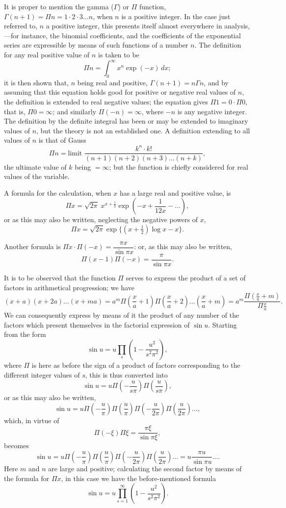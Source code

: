 \documentclass[11pt,a4paper]{book}
\begin{document}
It is proper to mention the gamma ($\Gamma$) or $\Pi$ function, $\Gamma(n + 1) = \Pi n = 1 \cdot 2 \cdot 3 \ldots n$, when $n$ is a positive integer. In the case just referred to, $n$ a positive integer, this presents itself almost everywhere in analysis,---for instance, the binomial coefficients, and the coefficients of the exponential series are expressible by means of such functions of a number $n$. The definition for any real positive value of $n$ is taken to be
\[
\Pi n = \int_{0}^{\infty} x^{n}\exp(-x)\,dx;
\]
it is then shown that, $n$ being real and positive, $\Gamma(n + 1) = n\Gamma n$, and by assuming that this equation holds good for positive or negative real values of $n$, the definition is extended to real negative values; the equation gives $\Pi 1 = 0 \cdot \Pi 0$, that is, $\Pi 0 = \infty$; and similarly $\Pi(-n) = \infty$, where $-n$ is any negative integer. The definition by the definite integral has been or may be extended to imaginary values of $n$, but the theory is not an established one. A definition extending to all values of $n$ is that of Gauss
\[
\Pi n = \text{limit } \frac{k^{n} \cdot k!}{(n + 1)(n + 2)(n + 3)\ldots(n + k)},
\]
the ultimate value of $k$ being $= \infty$; but the function is chiefly considered for real values of the variable.

A formula for the calculation, when $x$ has a large real and positive value, is
\[
\Pi x = \sqrt{2\pi}\; x^{x + \frac{1}{2}}\exp(-x + \frac{1}{12x} - \ldots),
\]
or as this may also be written, neglecting the negative powers of $x$,
\[
\Pi x = \sqrt{2\pi}\exp\{(x + \tfrac{1}{2})\log x - x\}.
\]

Another formula is $\Pi x \cdot \Pi(-x) = \dfrac{\pi x}{\sin\pi x}$: or, as this may also be written,
\[
\Pi(x - 1)\Pi(-x) = \frac{\pi}{\sin\pi x}.
\]

It is to be observed that the function $\Pi$ serves to express the product of a set of factors in arithmetical progression; we have
\[
(x + a)(x + 2a)\ldots(x + ma) = a^{m}\Pi\left(\frac{x}{a} + 1\right)\Pi\left(\frac{x}{a} + 2\right)\ldots\left(\frac{x}{a} + m\right) = a^{m}\frac{\Pi(\frac{x}{a} + m)}{\Pi\frac{x}{a}}.
\]
We can consequently express by means of it the product of any number of the factors which present themselves in the factorial expression of $\sin u$. Starting from the form
\[
\sin u = u\prod_{s}\left(1 - \frac{u^{2}}{s^{2}\pi^{2}}\right),
\]
where $\Pi$ is here as before the sign of a product of factors corresponding to the different integer values of $s$, this is thus converted into
\[
\sin u = u\Pi\left(-\frac{u}{s\pi}\right)\Pi\left(\frac{u}{s\pi}\right),
\]
or as this may also be written,
\[
\sin u = u\Pi\left(-\frac{u}{\pi}\right)\Pi\left(\frac{u}{\pi}\right)\Pi\left(-\frac{u}{2\pi}\right)\Pi\left(\frac{u}{2\pi}\right)\ldots,
\]
which, in virtue of
\[
\Pi(-\xi)\Pi\xi = \frac{\pi\xi}{\sin\pi\xi},
\]
becomes
\[
\sin u = u\Pi\left(-\frac{u}{\pi}\right)\Pi\left(\frac{u}{\pi}\right)\Pi\left(-\frac{u}{2\pi}\right)\Pi\left(\frac{u}{2\pi}\right)\ldots = u\frac{\pi u}{\sin\pi u}\ldots.
\]
Here $m$ and $n$ are large and positive; calculating the second factor by means of the formula for $\Pi x$, in this case we have the before-mentioned formula
\[
\sin u = u\prod_{s=1}^{\infty}\left(1 - \frac{u^{2}}{s^{2}\pi^{2}}\right).
\]
\end{document}
